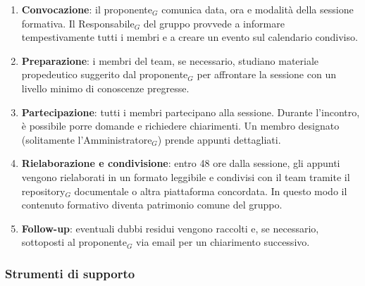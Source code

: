 \documentclass[a4paper, 10pt]{article}
\begin{document}
\begin{enumerate}
    \item \textbf{Convocazione}: il proponente$_G$ comunica data, ora e modalità della sessione formativa. Il Responsabile$_G$ del gruppo provvede a informare tempestivamente tutti i membri e a creare un evento sul calendario condiviso.
    \item \textbf{Preparazione}: i membri del team, se necessario, studiano materiale propedeutico suggerito dal proponente$_G$ per affrontare la sessione con un livello minimo di conoscenze pregresse.
    \item \textbf{Partecipazione}: tutti i membri partecipano alla sessione. Durante l'incontro, è possibile porre domande e richiedere chiarimenti. Un membro designato (solitamente l'Amministratore$_G$) prende appunti dettagliati.
    \item \textbf{Rielaborazione e condivisione}: entro 48 ore dalla sessione, gli appunti vengono rielaborati in un formato leggibile e condivisi con il team tramite il repository$_G$ documentale o altra piattaforma concordata. In questo modo il contenuto formativo diventa patrimonio comune del gruppo.
    \item \textbf{Follow-up}: eventuali dubbi residui vengono raccolti e, se necessario, sottoposti al proponente$_G$ via email per un chiarimento successivo.
\end{enumerate}

\subsubsection{Strumenti di supporto}
\label{subsubsec:strumenti_formazione}
\end{document}
